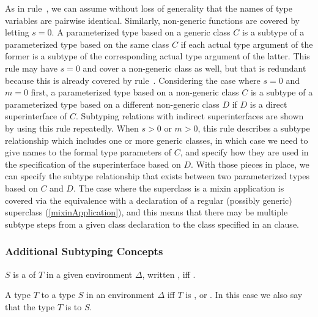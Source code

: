 \documentclass[makeidx]{article}
\begin{document}
{\begin{itemize}
  As in rule~\SrnPositionalFunctionType,
  we can assume without loss of generality
  that the names of type variables are pairwise identical.
  Similarly, non-generic functions are covered by letting $s = 0$.
  A parameterized type based on a generic class $C$ is a subtype of
  a parameterized type based on the same class $C$ if
  each actual type argument of the former is a subtype of
  the corresponding actual type argument of the latter.
  This rule may have $s = 0$ and cover a non-generic class as well,
  but that is redundant because this is already covered by
  rule~\SrnReflexivity.
  Considering the case where $s = 0$ and $m = 0$ first,
  a parameterized type based on a non-generic class $C$ is a subtype of
  a parameterized type based on a different non-generic class $D$ if
  $D$ is a direct superinterface of $C$.
  Subtyping relations with indirect superinterfaces are shown by
  using this rule repeatedly.
  When $s > 0$ or $m > 0$, this rule describes a subtype relationship
  which includes one or more generic classes,
  in which case we need to give names to the formal type parameters of $C$,
  and specify how they are used in the specification of the superinterface
  based on $D$.
  With those pieces in place, we can specify the subtype relationship
  that exists between two parameterized types based on $C$ and $D$.
  The case where the superclass is a mixin application is covered via
  the equivalence with a declaration of a regular (possibly generic) superclass
  (\ref{mixinApplication}),
  and this means that there may be multiple subtype steps from
  a given class declaration to the class specified in an \EXTENDS{} clause.
\end{itemize}%
}


\subsubsection{Additional Subtyping Concepts}

\LMHash{}%
$S$ is a  of $T$ in a given environment $\Delta$,
written ,
if{}f .

\LMHash{}%
A type $T$
to a type $S$ in an environment $\Delta$
if{}f $T$ is \DYNAMIC, or .
In this case we also say that the type $T$ is  to $S$.
\end{document}
